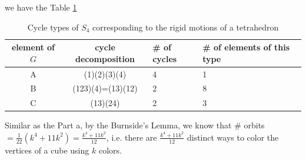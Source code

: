 \begin{answer}
    we have the Table \ref{tab:tab3}
    \begin{table}[H]
    \centering
        \begin{tabular}{|c|c|l|l|}
        \hline
        \textbf{element of $G$} & \textbf{cycle decomposition} & \textbf{\# of cycles} & \textbf{\# of elements of this type} \\ \hline
        A                       & (1)(2)(3)(4)                 & 4                     & 1                                    \\ \hline
        B                       & (123)(4)=(13)(12)            & 2                     & 8                                    \\ \hline
        C                       & (13)(24)                     & 2                     & 3                                    \\ \hline
        \end{tabular}
    \caption{Cycle types of $S_4$ corresponding to the rigid motions of a tetrahedron}
    \label{tab:tab3}
    \end{table}
    Similar as the Part a, by the Burnside's Lemma, we know that \# orbits $= \tfrac{1}{22}(k^4 + 11k^2) = \tfrac{k^4 + 11k^2}{12}$, i.e. there are $\tfrac{k^4 + 11k^2}{12}$ distinct ways to color the vertices of a cube using $k$ colors.
\end{answer}